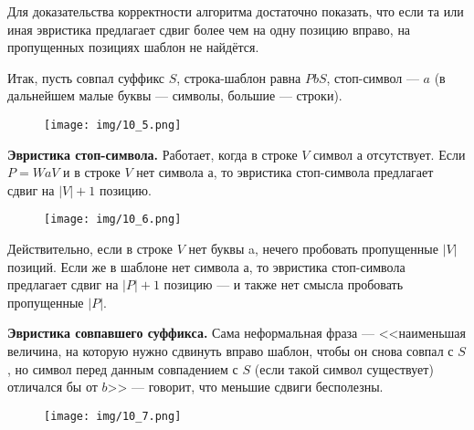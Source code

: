 Для доказательства корректности алгоритма достаточно показать, что если та или иная эвристика предлагает сдвиг более чем на одну позицию вправо, на пропущенных позициях шаблон не найдётся.

Итак, пусть совпал суффикс $S$, строка-шаблон равна $PbS$, стоп-символ — $a$ (в дальнейшем малые буквы — символы, большие — строки).

\begin{figure}[h!]
	\centering
	\texttt{[image: img/10\_5.png]}
	\captionsetup{labelformat=empty}
	\caption{\textbf{}}
\end{figure}

\textbf{Эвристика стоп-символа.} 
Работает, когда в строке $V$ символ $а$ отсутствует. Если $P=WaV$ и в строке $V$ нет символа а, то эвристика стоп-символа предлагает сдвиг на $|V|+1$ позицию.

\begin{figure}[h!]
	\centering
	\texttt{[image: img/10\_6.png]}
	\captionsetup{labelformat=empty}
	\caption{\textbf{}}
\end{figure}

Действительно, если в строке $V$ нет буквы a, нечего пробовать пропущенные $|V|$ позиций.
Если же в шаблоне нет символа а, то эвристика стоп-символа предлагает сдвиг на $|P|+1$ позицию — и также нет смысла пробовать пропущенные $|P|$.

\textbf{Эвристика совпавшего суффикса. }
Сама неформальная фраза — <<наименьшая величина, на которую нужно сдвинуть вправо шаблон, чтобы он снова совпал с $S$, но символ перед данным совпадением с $S$ (если такой символ существует) отличался бы от $b$>> — говорит, что меньшие сдвиги бесполезны.

\begin{figure}[h!]
	\centering
	\texttt{[image: img/10\_7.png]}
	\captionsetup{labelformat=empty}
	\caption{\textbf{}}
\end{figure}

